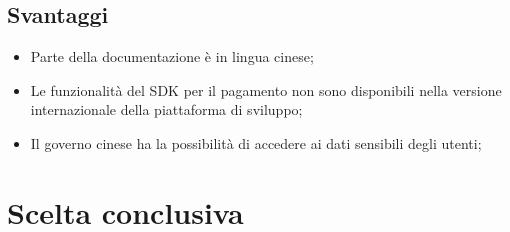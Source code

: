 \documentclass[11pt,notitlepage]{article}
\begin{document}
\subsection*{Svantaggi}
\begin{itemize}
		\item Parte della documentazione è in lingua cinese;
		\item Le funzionalità del SDK per il pagamento non sono disponibili nella versione internazionale della piattaforma di sviluppo;
		\item Il governo cinese ha la possibilità di accedere ai dati sensibili degli utenti;
\end{itemize} 

\bigskip
\section*{Scelta conclusiva}
\end{document}

